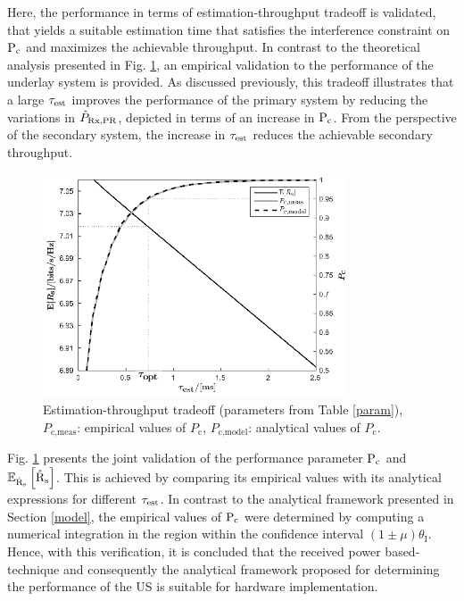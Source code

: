 Here, the performance in terms of estimation-throughput tradeoff is validated, that yields a suitable estimation time that satisfies the interference constraint on $\text{P}_{\text{c}}$ and maximizes the achievable throughput. In contrast to the theoretical analysis presented in Fig. \ref{RspocstricheA}, an empirical validation to the performance of the underlay system is provided. As discussed previously, this tradeoff illustrates that a large $\tau_{\text{est}}$ improves the performance of the primary system by reducing the variations in $\hat{P}_{\text{Rx,PR}}$, depicted in terms of an increase in $\text{P}_{\text{c}}$. From the perspective of the secondary system, the increase in $\tau_{\text{est}}$ reduces the achievable secondary throughput.
\begin{figure}
	\centering
	\includegraphics[width=0.8\textwidth]{figures/Rs_poc_striche}
	\caption{Estimation-throughput tradeoff (parameters from Table \ref{param}), $P_\textrm{c,meas}$: empirical values of $P_\textrm{c}$, $P_\textrm{c,model}$: analytical values of $P_\textrm{c}$.}
	\label{RspocstricheA}
\end{figure}
Fig. \ref{RspocstricheA} presents the joint validation of the performance parameter $\text{P}_{\text{c}}$ and ${\mathbb E}_{\hat{\text{{R}}}_{\text{s}}}\left[ \hat{\text{{R}}}_{\text{s}} \right]$. This is achieved by comparing its empirical values with its analytical expressions for different $\tau_{\text{est}}$. In contrast to the analytical framework presented in Section \ref{model}, the empirical values of $\text{P}_{\text{c}}$ were determined by computing a numerical integration in the region within the confidence interval $(1  \pm \mu)  \theta_\textrm{I}$. Hence, with this verification, it is concluded that the received power based-technique and consequently the analytical framework proposed for determining the performance of the US is suitable for hardware implementation.

